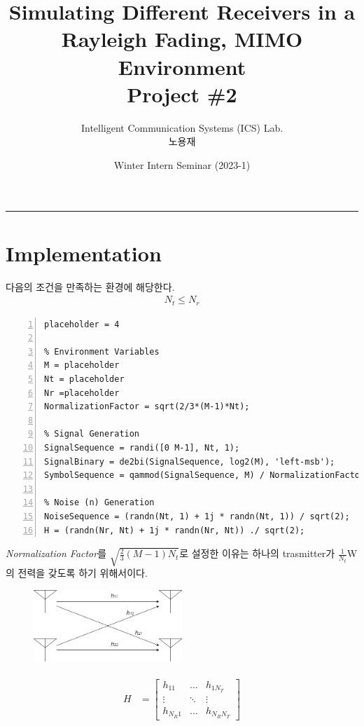 \documentclass{article}
\title{Simulating Different Receivers in a \\Rayleigh Fading, MIMO Environment\\
\large Project \#2}
\author{Intelligent Communication Systems (ICS) Lab.\\노용재}
\date{Winter Intern Seminar (2023-1)}
\begin{document}
\maketitle
\tableofcontents
\vspace{0.5cm}
\hrule
\vspace{0.5cm}

\section{Implementation}
다음의 조건을 만족하는 환경에 해당한다.
\begin{gather}
N_t \leq N_r
\end{gather}
\begin{lstlisting}[style=Matlab-editor, frame=single, numbers=left,]
placeholder = 4

% Environment Variables
M = placeholder
Nt = placeholder
Nr =placeholder
NormalizationFactor = sqrt(2/3*(M-1)*Nt);

% Signal Generation
SignalSequence = randi([0 M-1], Nt, 1);
SignalBinary = de2bi(SignalSequence, log2(M), 'left-msb');
SymbolSequence = qammod(SignalSequence, M) / NormalizationFactor;

% Noise (n) Generation
NoiseSequence = (randn(Nt, 1) + 1j * randn(Nt, 1)) / sqrt(2);
H = (randn(Nr, Nt) + 1j * randn(Nr, Nt)) ./ sqrt(2);
\end{lstlisting}
\textsl{Normalization Factor}를 $\sqrt{\frac{2}{3}(M-1)N_t}$로 설정한 이유는 하나의 trasmitter가 $\frac{1}{N_t}$W의 전력을 갖도록 하기 위해서이다.\\
\begin{figure}[H]
	\centerline{\includegraphics[width=0.5\textwidth]{antenna.png}}
	\caption{}
\end{figure}
\begin{gather}
	\begin{split}
		H &=
		\begin{bmatrix}
		h_{11} & \hdots & h_{1N_T}\\
		\vdots & \ddots & \vdots\\
		h_{N_R1} & \hdots & h_{N_R N_T}
		\end{bmatrix}
	\end{split}
\end{gather}
\end{document}
